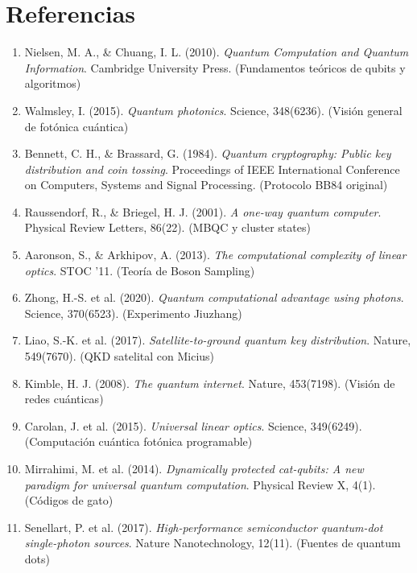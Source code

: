 \documentclass{article}
\begin{document}
\section*{Referencias}
\begin{enumerate}
    \item Nielsen, M. A., \& Chuang, I. L. (2010). \emph{Quantum Computation and Quantum Information}. Cambridge University Press. (Fundamentos teóricos de qubits y algoritmos)
    
    \item Walmsley, I. (2015). \emph{Quantum photonics}. Science, 348(6236). (Visión general de fotónica cuántica)
    
    \item Bennett, C. H., \& Brassard, G. (1984). \emph{Quantum cryptography: Public key distribution and coin tossing}. Proceedings of IEEE International Conference on Computers, Systems and Signal Processing. (Protocolo BB84 original)
    
    \item Raussendorf, R., \& Briegel, H. J. (2001). \emph{A one-way quantum computer}. Physical Review Letters, 86(22). (MBQC y cluster states)
    
    \item Aaronson, S., \& Arkhipov, A. (2013). \emph{The computational complexity of linear optics}. STOC '11. (Teoría de Boson Sampling)
    
    \item Zhong, H.-S. et al. (2020). \emph{Quantum computational advantage using photons}. Science, 370(6523). (Experimento Jiuzhang)
    
    \item Liao, S.-K. et al. (2017). \emph{Satellite-to-ground quantum key distribution}. Nature, 549(7670). (QKD satelital con Micius)
    
    \item Kimble, H. J. (2008). \emph{The quantum internet}. Nature, 453(7198). (Visión de redes cuánticas)
    
    \item Carolan, J. et al. (2015). \emph{Universal linear optics}. Science, 349(6249). (Computación cuántica fotónica programable)
    
    \item Mirrahimi, M. et al. (2014). \emph{Dynamically protected cat-qubits: A new paradigm for universal quantum computation}. Physical Review X, 4(1). (Códigos de gato)
    
    \item Senellart, P. et al. (2017). \emph{High-performance semiconductor quantum-dot single-photon sources}. Nature Nanotechnology, 12(11). (Fuentes de quantum dots)
    

\end{enumerate}
\end{document}
